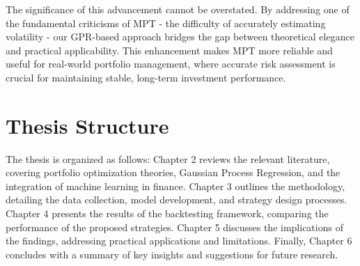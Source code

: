 The significance of this advancement cannot be overstated. By addressing one of the fundamental criticisms of \ac{MPT} - the difficulty of accurately estimating volatility - our \ac{GPR}-based approach bridges the gap between theoretical elegance and practical applicability. This enhancement makes \ac{MPT} more reliable and useful for real-world portfolio management, where accurate risk assessment is crucial for maintaining stable, long-term investment performance.



\section{Thesis Structure}
The thesis is organized as follows: Chapter 2 reviews the relevant literature, covering portfolio optimization theories, Gaussian Process Regression, and the integration of machine learning in finance. Chapter 3 outlines the methodology, detailing the data collection, model development, and strategy design processes. Chapter 4 presents the results of the backtesting framework, comparing the performance of the proposed strategies. Chapter 5 discusses the implications of the findings, addressing practical applications and limitations. Finally, Chapter 6 concludes with a summary of key insights and suggestions for future research.
